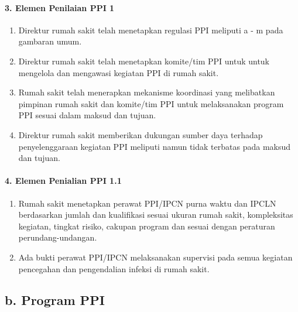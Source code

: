 \documentclass[
]{book}
\providecommand{\tightlist}{%
  \setlength{\itemsep}{0pt}\setlength{\parskip}{0pt}}
\begin{document}
\hypertarget{elemen-penilaian-ppi-1}{%
\paragraph*{3. Elemen Penilaian PPI 1}\label{elemen-penilaian-ppi-1}}

\begin{enumerate}
\def\labelenumi{\alph{enumi}.}
\tightlist
\item
  Direktur rumah sakit telah menetapkan regulasi PPI meliputi a - m pada gambaran umum.
\item
  Direktur rumah sakit telah menetapkan komite/tim PPI untuk untuk mengelola dan mengawasi kegiatan PPI di rumah sakit.
\item
  Rumah sakit telah menerapkan mekanisme koordinasi yang melibatkan pimpinan rumah sakit dan komite/tim PPI untuk melaksanakan program PPI sesuai dalam maksud dan tujuan.
\item
  Direktur rumah sakit memberikan dukungan sumber daya terhadap penyelenggaraan kegiatan PPI meliputi namun tidak terbatas pada maksud dan tujuan.
\end{enumerate}

\hypertarget{elemen-penialian-ppi-1.1}{%
\paragraph*{4. Elemen Penialian PPI 1.1}\label{elemen-penialian-ppi-1.1}}

\begin{enumerate}
\def\labelenumi{\alph{enumi}.}
\tightlist
\item
  Rumah sakit menetapkan perawat PPI/IPCN purna waktu dan IPCLN berdasarkan jumlah dan kualifikasi sesuai ukuran rumah sakit, kompleksitas kegiatan, tingkat risiko, cakupan program dan sesuai dengan peraturan perundang-undangan.
\item
  Ada bukti perawat PPI/IPCN melaksanakan supervisi pada semua kegiatan pencegahan dan pengendalian infeksi di rumah sakit.
\end{enumerate}

\hypertarget{b.-program-ppi}{%
\subsection*{b. Program PPI}\label{b.-program-ppi}}
\end{document}
